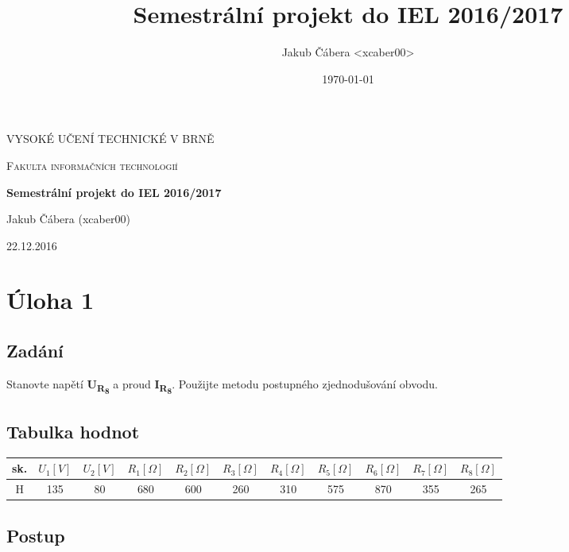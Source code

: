 \documentclass[a4paper,12pt]{article}
\title{Semestrální projekt do IEL 2016/2017}
\date{\today}
\author{Jakub Čábera <xcaber00>}
\begin{document}
\begin{titlepage}
	\centering
	{\scshape\LARGE VYSOKÉ UČENÍ TECHNICKÉ V BRNĚ \par}
	\vspace{1cm}
	{\scshape\LARGE Fakulta informačních technologií \par}
	\vspace{1.5cm}
	{\huge\bfseries Semestrální projekt do IEL 2016/2017\par}
	\vspace{2cm}
	{\Large Jakub Čábera (xcaber00)\par}
	\vfill

	{\large 22.12.2016 \par}
\end{titlepage}
\pagebreak

\section{Úloha 1} %
	\subsection{Zadání}
		Stanovte napětí \textbf{U\textsubscript{R\textsubscript{8}}} a proud \textbf{I\textsubscript{R\textsubscript{8}}}. Použijte metodu postupného zjednodušování obvodu.
	\subsection{Tabulka hodnot}
		\begin{table}[htbp]
			\noindent\begin{tabular}{*{11}{c}}
				\toprule
				sk. & \(U_1 [V]\) & \(U_2 [V]\) & \(R_1 [\Omega]\) & \(R_2 [\Omega]\) & \(R_3 [\Omega]\) & \(R_4 [\Omega]\) & \(R_5 [\Omega]\) & \(R_6 [\Omega]\) & \(R_7 [\Omega]\) & \(R_8 [\Omega]\) \\
				\midrule
				H & 135 & 80 & 680 & 600 & 260 & 310 & 575 & 870 & 355 & 265 \\
				\bottomrule
			\end{tabular}
		\end{table}
	\subsection{Postup}
\end{document}
